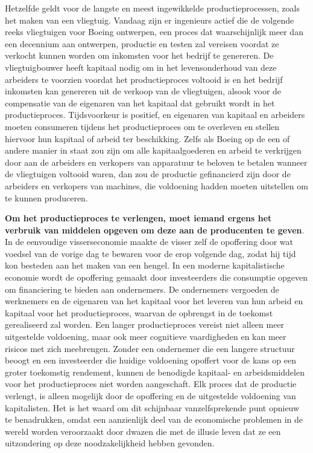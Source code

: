 Hetzelfde geldt voor de langste en meest ingewikkelde productieprocessen, zoals het maken van een vliegtuig. Vandaag zijn er ingenieurs actief die de volgende reeks vliegtuigen voor Boeing ontwerpen, een proces dat waarschijnlijk meer dan een decennium aan ontwerpen, productie en testen zal vereisen voordat ze verkocht kunnen worden om inkomsten voor het bedrijf te genereren. De vliegtuigbouwer heeft kapitaal nodig om in het levensonderhoud van deze arbeiders te voorzien voordat het productieproces voltooid is en het bedrijf inkomsten kan genereren uit de verkoop van de vliegtuigen, alsook voor de compensatie van de eigenaren van het kapitaal dat gebruikt wordt in het productieproces. Tijdsvoorkeur is positief, en eigenaren van kapitaal en arbeiders moeten consumeren tijdens het productieproces om te overleven en stellen hiervoor hun kapitaal of arbeid ter beschikking. Zelfs als Boeing op de een of andere manier in staat zou zijn om alle kapitaalgoederen en arbeid te verkrijgen door aan de arbeiders en verkopers van apparatuur te beloven te betalen wanneer de vliegtuigen voltooid waren, dan zou de productie gefinancierd zijn door de arbeiders en verkopers van machines, die voldoening hadden moeten uitstellen om te kunnen produceren.

\textbf{Om het productieproces te verlengen, moet iemand ergens het verbruik van middelen opgeven om deze aan de producenten te geven}. In de eenvoudige visserseconomie maakte de visser zelf de opoffering door wat voedsel van de vorige dag te bewaren voor de erop volgende dag, zodat hij tijd kon besteden aan het maken van een hengel. In een moderne kapitalistische economie wordt de opoffering gemaakt door investeerders die consumptie opgeven om financiering te bieden aan ondernemers. De ondernemers vergoeden de werknemers en de eigenaren van het kapitaal voor het leveren van hun arbeid en kapitaal voor het productieproces, waarvan de opbrengst in de toekomst gerealiseerd zal worden. Een langer productieproces vereist niet alleen meer uitgestelde voldoening, maar ook meer cognitieve vaardigheden en kan meer risico\textquotesingle s met zich meebrengen. Zonder een ondernemer die een langere structuur beoogt en een investeerder die huidige voldoening opoffert voor de kans op een groter toekomstig rendement, kunnen de benodigde kapitaal- en arbeidsmiddelen voor het productieproces niet worden aangeschaft. Elk proces dat de productie verlengt, is alleen mogelijk door de opoffering en de uitgestelde voldoening van kapitalisten. Het is het waard om dit schijnbaar vanzelfsprekende punt opnieuw te benadrukken, omdat een aanzienlijk deel van de economische problemen in de wereld worden veroorzaakt door dwazen die met de illusie leven dat ze een uitzondering op deze noodzakelijkheid hebben gevonden.

